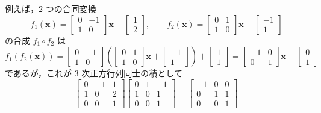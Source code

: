 \documentclass[11pt, uplatex, dvipdfmx, titlepage]{jsarticle}
\theoremstyle{definition}
\begin{document}
例えば，$2$ つの合同変換
\[
  f_1(\bm{x}) = \left[
    \begin{array}{rr}
      0 & -1\\
      1 & 0
    \end{array}
  \right] \bm{x} + \left[
    \begin{array}{r}
      1\\
      2
    \end{array}
  \right], \qquad f_2(\bm{x}) = \left[
    \begin{array}{rr}
      0 & 1\\
      1 & 0
    \end{array}
  \right] \bm{x} + \left[
    \begin{array}{r}
      -1\\
      1
    \end{array}
  \right]
\]
の合成 $f_1 \circ f_2$ は
\[
  f_1( f_2(\bm{x})) = \left[
    \begin{array}{rr}
      0 & -1\\
      1 & 0
    \end{array}
  \right] \left( \left[
      \begin{array}{rr}
        0 & 1\\
        1 & 0
      \end{array}
    \right] \bm{x} + \left[
      \begin{array}{r}
        -1\\
        1
      \end{array}
    \right] \right) + \left[
    \begin{array}{r}
      1\\
      1
    \end{array}
  \right] = \left[
    \begin{array}{rr}
      -1 & 0\\
      0 & 1
    \end{array}
  \right] \bm{x} + \left[
    \begin{array}{r}
      0\\
      1
    \end{array}
  \right]
\]
であるが，これが $3$ 次正方行列同士の積として
\[
  \left[
    \begin{array}{rr|r}
      0 & -1 & 1\\
      1 & 0 & 2\\ \hline
      0 & 0 & 1
    \end{array}
  \right] \left[
    \begin{array}{rr|r}
      0 & 1 & -1\\
      1 & 0 & 1\\ \hline
      0 & 0 & 1
    \end{array}
  \right] = \left[
    \begin{array}{rr|r}
      -1 & 0 & 0\\
      0 & 1 & 1\\ \hline
      0 & 0 & 1
    \end{array}
  \right]
\]
\end{document}
